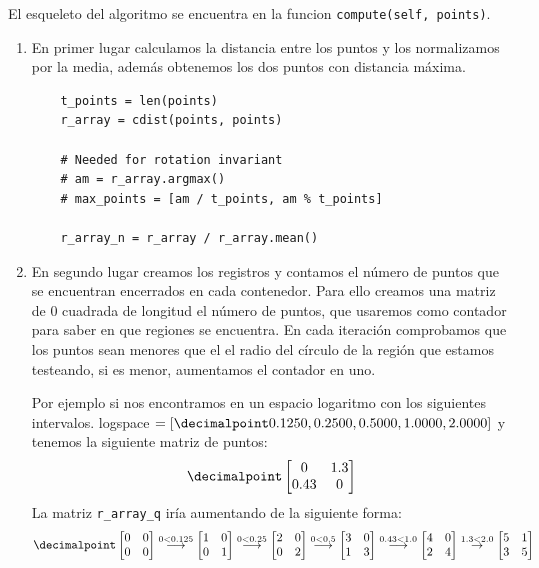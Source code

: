 \documentclass[size=a4, parskip=half, titlepage=false, toc=flat, toc=bib, 12pt]{scrartcl}
\begin{document}
El esqueleto del algoritmo se encuentra en la funcion \verb|compute(self, points)|.
\begin{enumerate}
\item En primer lugar calculamos la distancia entre los puntos y los normalizamos por la media, además obtenemos los dos puntos con distancia máxima.

\begin{verbatim}
    t_points = len(points)
    r_array = cdist(points, points)

    # Needed for rotation invariant
    # am = r_array.argmax()
    # max_points = [am / t_points, am % t_points]

    r_array_n = r_array / r_array.mean()
\end{verbatim}

\item En segundo lugar creamos los registros y contamos el número de puntos que se encuentran encerrados en cada contenedor. Para ello creamos una matriz de 0 cuadrada de longitud el número de puntos, que usaremos como contador para saber en que regiones se encuentra. En cada iteración comprobamos que los puntos sean menores que el el radio del círculo de la región que estamos testeando, si es menor, aumentamos el contador en uno.

Por ejemplo si nos encontramos en un espacio logaritmo con los siguientes intervalos.
logspace $= [\decimalpoint 0.1250, 0.2500, 0.5000, 1.0000, 2.0000]$ y tenemos la siguiente matriz de puntos:
$$\decimalpoint \begin{bmatrix}
0 & 1.3 \\
0.43 & 0
\end{bmatrix}$$
La matriz \verb|r_array_q| iría aumentando de la siguiente forma:
$$\decimalpoint \begin{bmatrix}
0 & 0 \\
0 & 0
\end{bmatrix} \stackrel{0 < 0.125}{\longrightarrow} \begin{bmatrix}
1 & 0 \\
0 & 1
\end{bmatrix} \stackrel{0 < 0.25}{\longrightarrow} \begin{bmatrix}
2 & 0 \\
0 & 2
\end{bmatrix} \stackrel{0 < 0.5}{\longrightarrow} \begin{bmatrix}
3 & 0 \\
1 & 3
\end{bmatrix} \stackrel{0.43 < 1.0}{\longrightarrow} \begin{bmatrix}
4 & 0 \\
2 & 4
\end{bmatrix} \stackrel{1.3 < 2.0}\rightarrow \begin{bmatrix}
5 & 1 \\
3 & 5
\end{bmatrix}$$


\end{enumerate}
\end{document}
